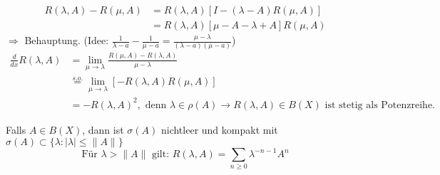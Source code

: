 \begin{beweis}
	\begin{align*}
		R( \lambda, A) - R( \mu, A) & = R( \lambda, A) \left[ I - (\lambda - A) R(\mu, A) \right]	\\
			& = R( \lambda, A) \left[ \mu - A - \lambda + A \right] R(\mu, A)
	\end{align*}
	$\Rightarrow$ Behauptung. (Idee: $\frac{1}{\lambda - a} - \frac{1}{\mu - a} = \frac{\mu - \lambda}{(\lambda - a)(\mu - a)}$)
	\begin{align*}
		\frac{d}{dx} R(\lambda, A) & = \lim_{\mu \rightarrow \lambda} \frac{R(\mu, A) - R(\lambda, A)}{\mu - \lambda} \\
				& \overset{s.o.}{=} \lim_{\mu \rightarrow \lambda} \left[ - R( \lambda, A) R(\mu, A) \right] \\
				& = - R(\lambda, A)^{2}, \text{ denn } \lambda \in \rho(A) \rightarrow R(\lambda, A) \in B(X) \text{ ist stetig als Potenzreihe.} 		
	\end{align*}
\end{beweis}


\begin{satz} \label{satz:13.6}
	Falls $A \in B(X)$, dann ist $\sigma(A)$ nichtleer und kompakt mit $\sigma(A) \subset \{ \lambda : |\lambda| \leq \| A \| \}$ \\
	\[ \text{Für } \lambda > \| A \| \text{ gilt: } R(\lambda, A) = \sum_{n \geq 0} \lambda^{-n-1} A^{n} \]
\end{satz}

